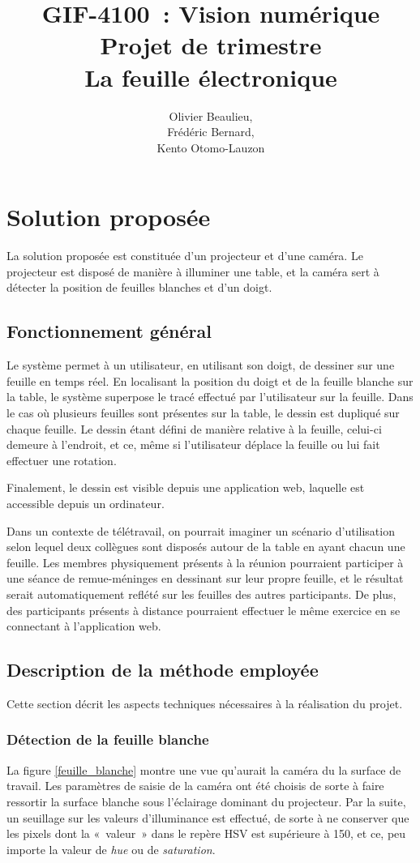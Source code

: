 \documentclass[11pt]{report}
\title{\textbf{GIF-4100 : Vision numérique\\ Projet de trimestre \\La feuille électronique}}
\author{Olivier Beaulieu,\\Frédéric Bernard,\\Kento Otomo-Lauzon}
\begin{document}
\maketitle
 

\newpage

\section{Solution proposée}
La solution proposée est constituée d'un projecteur et d'une caméra. Le
projecteur est disposé de manière à illuminer une table, et la caméra sert à
détecter la position de feuilles blanches et d'un doigt.

\subsection{Fonctionnement général}
Le système permet à un utilisateur, en utilisant son doigt, de dessiner sur une
feuille en temps réel. En localisant la position du doigt et de la feuille
blanche sur la table, le système superpose le tracé effectué par l'utilisateur
sur la feuille. Dans le cas où plusieurs feuilles sont présentes sur la table,
le dessin est dupliqué sur chaque feuille. Le dessin étant défini de manière
relative à la feuille, celui-ci demeure à l'endroit, et ce, même si
l'utilisateur déplace la feuille ou lui fait effectuer une rotation.

Finalement, le dessin est visible depuis une application web, laquelle est
accessible depuis un ordinateur.

Dans un contexte de télétravail, on pourrait imaginer un scénario d'utilisation
selon lequel deux collègues sont disposés autour de la table en ayant chacun une
feuille. Les membres physiquement présents à la réunion pourraient participer à
une séance de remue-méninges en dessinant sur leur propre feuille, et le
résultat serait automatiquement reflété sur les feuilles des autres
participants. De plus, des participants présents à distance pourraient effectuer
le même exercice en se connectant à l'application web. 

\subsection{Description de la méthode employée}
Cette section décrit les aspects techniques nécessaires à la réalisation du projet.

\subsubsection{Détection de la feuille blanche}
La figure \ref{feuille_blanche} montre une vue qu'aurait la caméra du la surface
de travail. Les paramètres de saisie de la caméra ont été choisis de sorte à
faire ressortir la surface blanche sous l'éclairage dominant du projecteur. Par
la suite, un seuillage sur les valeurs d'illuminance est effectué, de sorte à ne
conserver que les pixels dont la « valeur » dans le repère HSV est supérieure à
150, et ce, peu importe la valeur de \textit{hue} ou de \textit{saturation}.
\end{document}
